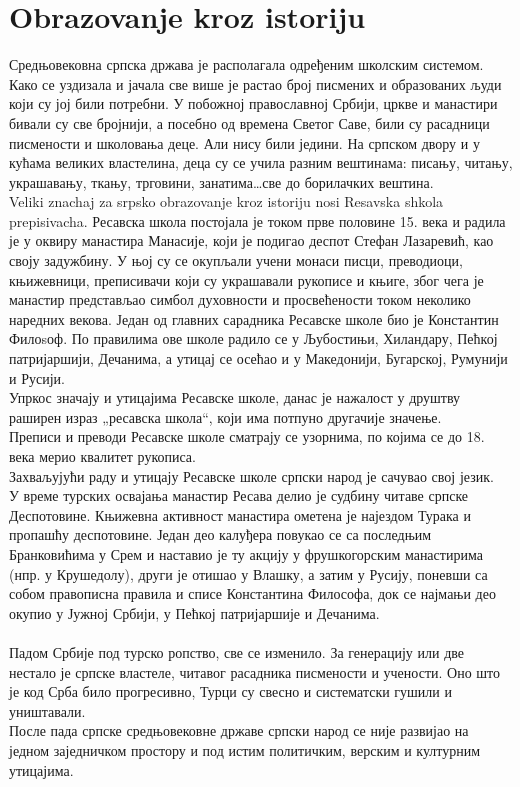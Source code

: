 \documentclass[12pt,twoside]{article}
\begin{document}
  \section{Obrazovanje kroz istoriju}
  Средњовековна српска држава је располагала одређеним школским системом. Како се уздизала и јачала све више је растао број писмених и образованих људи који су јој били потребни. У побожној православној Србији, цркве и манастири бивали су све бројнији, а посебно од времена Светог Саве, били су расадници писмености и школовања деце. Али нису били једини. На српском двору и у кућама великих властелина, деца су се учила разним вештинама: писању, читању, украшавању, ткању, трговини, занатима…све до борилачких вештина.
  \\Veliki znachaj za srpsko obrazovanje kroz istoriju nosi Resavska shkola prepisivacha. Ресавска школа постојала је током прве половине 15. века и радила је у оквиру манастира Манасије, који је подигао деспот Стефан Лазаревић, као своју задужбину. У њој су се окупљали учени монаси писци, преводиоци, књижевници, преписивачи који су украшавали рукописе и књиге, због чега је манастир представљао симбол духовности и просвећености током неколико наредних векова. Један од главних сарадника Ресавске школе био је Константин Филоsоф. По правилима ове школе радило се у Љубостињи, Хиландару, Пећкој патријаршији, Дечанима, а утицај се осећао и у Македонији, Бугарској, Румунији и Русији. \\Упркос значају и утицајима Ресавске школе, данас је нажалост у друштву раширен израз „ресавска школа“, који има потпуно другачије значење.\\ Преписи и преводи Ресавске школе сматрају се узорнима, по којима се до 18. века мерио квалитет рукописа.\\ Захваљујући раду и утицају Ресавске школе српски народ је сачувао свој језик. \\ У време турских освајања манастир Ресава делио је судбину читаве српске Деспотовине. Књижевна активност манастира ометена је најездом Турака и пропашћу деспотовине. Један део калуђера повукао се са последњим Бранковићима у Срем и наставио је ту акцију у фрушкогорским манастирима (нпр. у Крушедолу), други је отишао у Влашку, а затим у Русију, поневши са собом правописна правила и списе Константина Философа, док се најмањи део окупио у Јужној Србији, у Пећкој патријаршије и Дечанима.\\
  \\ Падом Србије под турско ропство, све се изменило. За генерацију или две нестало је српске властеле, читавог расадника писмености и учености. Оно што је код Срба било прогресивно, Турци су свесно и систематски гушили и уништавали. \\После пада српске средњовековне државе српски народ се није развијао на једном заједничком простору и под истим политичким, верским и културним утицајима.\\
\end{document}
